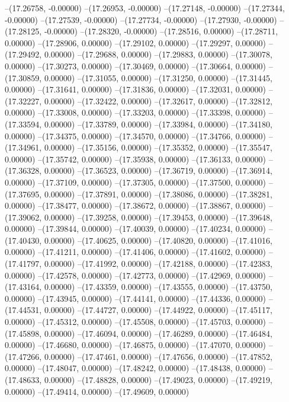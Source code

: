 --(17.26758, -0.00000)
--(17.26953, -0.00000)
--(17.27148, -0.00000)
--(17.27344, -0.00000)
--(17.27539, -0.00000)
--(17.27734, -0.00000)
--(17.27930, -0.00000)
--(17.28125, -0.00000)
--(17.28320, -0.00000)
--(17.28516, 0.00000)
--(17.28711, 0.00000)
--(17.28906, 0.00000)
--(17.29102, 0.00000)
--(17.29297, 0.00000)
--(17.29492, 0.00000)
--(17.29688, 0.00000)
--(17.29883, 0.00000)
--(17.30078, 0.00000)
--(17.30273, 0.00000)
--(17.30469, 0.00000)
--(17.30664, 0.00000)
--(17.30859, 0.00000)
--(17.31055, 0.00000)
--(17.31250, 0.00000)
--(17.31445, 0.00000)
--(17.31641, 0.00000)
--(17.31836, 0.00000)
--(17.32031, 0.00000)
--(17.32227, 0.00000)
--(17.32422, 0.00000)
--(17.32617, 0.00000)
--(17.32812, 0.00000)
--(17.33008, 0.00000)
--(17.33203, 0.00000)
--(17.33398, 0.00000)
--(17.33594, 0.00000)
--(17.33789, 0.00000)
--(17.33984, 0.00000)
--(17.34180, 0.00000)
--(17.34375, 0.00000)
--(17.34570, 0.00000)
--(17.34766, 0.00000)
--(17.34961, 0.00000)
--(17.35156, 0.00000)
--(17.35352, 0.00000)
--(17.35547, 0.00000)
--(17.35742, 0.00000)
--(17.35938, 0.00000)
--(17.36133, 0.00000)
--(17.36328, 0.00000)
--(17.36523, 0.00000)
--(17.36719, 0.00000)
--(17.36914, 0.00000)
--(17.37109, 0.00000)
--(17.37305, 0.00000)
--(17.37500, 0.00000)
--(17.37695, 0.00000)
--(17.37891, 0.00000)
--(17.38086, 0.00000)
--(17.38281, 0.00000)
--(17.38477, 0.00000)
--(17.38672, 0.00000)
--(17.38867, 0.00000)
--(17.39062, 0.00000)
--(17.39258, 0.00000)
--(17.39453, 0.00000)
--(17.39648, 0.00000)
--(17.39844, 0.00000)
--(17.40039, 0.00000)
--(17.40234, 0.00000)
--(17.40430, 0.00000)
--(17.40625, 0.00000)
--(17.40820, 0.00000)
--(17.41016, 0.00000)
--(17.41211, 0.00000)
--(17.41406, 0.00000)
--(17.41602, 0.00000)
--(17.41797, 0.00000)
--(17.41992, 0.00000)
--(17.42188, 0.00000)
--(17.42383, 0.00000)
--(17.42578, 0.00000)
--(17.42773, 0.00000)
--(17.42969, 0.00000)
--(17.43164, 0.00000)
--(17.43359, 0.00000)
--(17.43555, 0.00000)
--(17.43750, 0.00000)
--(17.43945, 0.00000)
--(17.44141, 0.00000)
--(17.44336, 0.00000)
--(17.44531, 0.00000)
--(17.44727, 0.00000)
--(17.44922, 0.00000)
--(17.45117, 0.00000)
--(17.45312, 0.00000)
--(17.45508, 0.00000)
--(17.45703, 0.00000)
--(17.45898, 0.00000)
--(17.46094, 0.00000)
--(17.46289, 0.00000)
--(17.46484, 0.00000)
--(17.46680, 0.00000)
--(17.46875, 0.00000)
--(17.47070, 0.00000)
--(17.47266, 0.00000)
--(17.47461, 0.00000)
--(17.47656, 0.00000)
--(17.47852, 0.00000)
--(17.48047, 0.00000)
--(17.48242, 0.00000)
--(17.48438, 0.00000)
--(17.48633, 0.00000)
--(17.48828, 0.00000)
--(17.49023, 0.00000)
--(17.49219, 0.00000)
--(17.49414, 0.00000)
--(17.49609, 0.00000)
